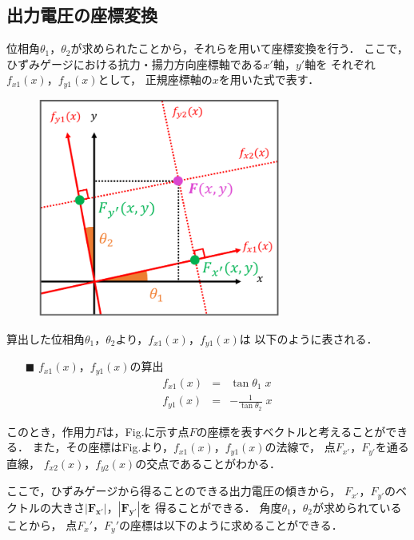 \documentclass[twocolumn,a4j]{jsarticle}
\begin{document}
\subsection{出力電圧の座標変換}
位相角$\theta_1$，$\theta_2$が求められたことから，それらを用いて座標変換を行う．
ここで，ひずみゲージにおける抗力・揚力方向座標軸である$x'$軸，$y'$軸を
それぞれ$f_{x1}\left(x\right)$，$f_{y1}\left(x\right)$として，
正規座標軸の$x$を用いた式で表す．

\begin{figure}[htbp]
    \footnotesize
    \begin{center}
        \includegraphics[width=80mm]{../images/image_3.png}
        \caption{}
    \end{center}
\end{figure}

算出した位相角$\theta_1$，$\theta_2$より，$f_{x1}\left(x\right)$，$f_{y1}\left(x\right)$は
以下のように表される．

\begin{itemize}
    \item [$\blacksquare$] $f_{x1}\left(x\right)$，$f_{y1}\left(x\right)$の算出
    \begin{eqnarray*}
        f_{x1}\left(x\right) &=& \tan \theta_1 \; x\\
        f_{y1}\left(x\right) &=& - \frac{1}{\tan \theta_2}\; x
    \end{eqnarray*}    
\end{itemize}

このとき，作用力$F$は，Fig.に示す点$F$の座標を表すベクトルと考えることができる．
また，その座標はFig.より，$f_{x1}\left(x\right)$，$f_{y1}\left(x\right)$の法線で，
点$F_{x'}$，$F_{y'}$を通る直線，
$f_{x2}\left(x\right)$，$f_{y2}\left(x\right)$の交点であることがわかる．\par
ここで，ひずみゲージから得ることのできる出力電圧の傾きから，
$F_{x'}$，$F_{y'}$のベクトルの大きさ$|\boldsymbol{F_{x'}}|$，$|\boldsymbol{F_{y'}}|$を
得ることができる．
角度$\theta_1$，$\theta_2$が求められていることから，
点$F_x'$，$F_y'$の座標は以下のように求めることができる．
\end{document}
